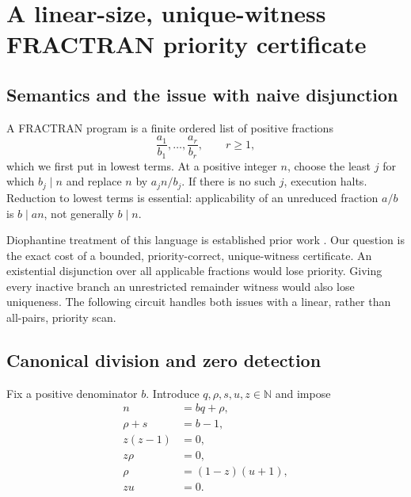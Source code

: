 \documentclass[11pt,a4paper]{article}
\theoremstyle{definition}
\theoremstyle{remark}
\newcommand{\N}{\mathbb N}
\newcommand{\srctag}[1]{\texorpdfstring{\hspace{0.5em}{\normalfont\small\color{accent}[#1]}}{ [#1]}}
\begin{document}
\section{A linear-size, unique-witness FRACTRAN priority certificate\srctag{04}}
\subsection{Semantics and the issue with naive disjunction}
A FRACTRAN program is a finite ordered list of positive fractions
\[
 \frac{a_1}{b_1},\ldots,\frac{a_r}{b_r},\qquad r\geq1,
\]
which we first put in lowest terms. At a positive integer $n$, choose the least $j$ for which $b_j\mid n$ and replace $n$ by $a_jn/b_j$. If there is no such $j$, execution halts. Reduction to lowest terms is essential: applicability of an unreduced fraction $a/b$ is $b\mid an$, not generally $b\mid n$.

Diophantine treatment of this language is established prior work \cite{conway1987,lf2019}. Our question is the exact cost of a bounded, priority-correct, unique-witness certificate. An existential disjunction over all applicable fractions would lose priority. Giving every inactive branch an unrestricted remainder witness would also lose uniqueness. The following circuit handles both issues with a linear, rather than all-pairs, priority scan.

\subsection{Canonical division and zero detection}
Fix a positive denominator $b$. Introduce $q,\rho,s,u,z\in\N$ and impose
\begin{align}
 n&=bq+\rho,\label{cdc:wf:eq:frac-div}\\
 \rho+s&=b-1,\label{cdc:wf:eq:frac-bound}\\
 z(z-1)&=0,\label{cdc:wf:eq:frac-bit}\\
 z\rho&=0,\label{cdc:wf:eq:frac-zero}\\
 \rho&=(1-z)(u+1),\label{cdc:wf:eq:frac-positive}\\
 zu&=0.\label{cdc:wf:eq:frac-inactive}
\end{align}
\end{document}
